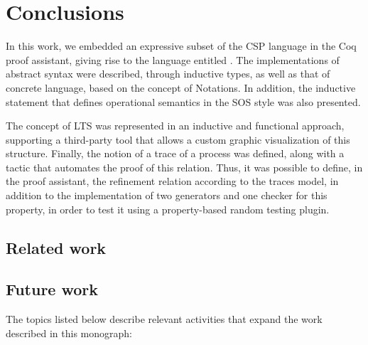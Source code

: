 \chapter{Conclusions}

In this work, we embedded an expressive subset of the CSP language in the Coq proof assistant, giving rise to the language entitled \CSPcoq{}. The implementations of abstract syntax were described, through inductive types, as well as that of concrete language, based on the concept of Notations. In addition, the inductive statement that defines operational semantics in the SOS style was also presented.

The concept of LTS was represented in an inductive and functional approach, supporting a third-party tool that allows a custom graphic visualization of this structure. Finally, the notion of a trace of a process was defined, along with a tactic that automates the proof of this relation. Thus, it was possible to define, in the proof assistant, the refinement relation according to the traces model, in addition to the implementation of two generators and one checker for this property, in order to test it using a property-based random testing plugin.

\section{Related work}

\section{Future work}

The topics listed below describe relevant activities that expand the work described in this monograph:

